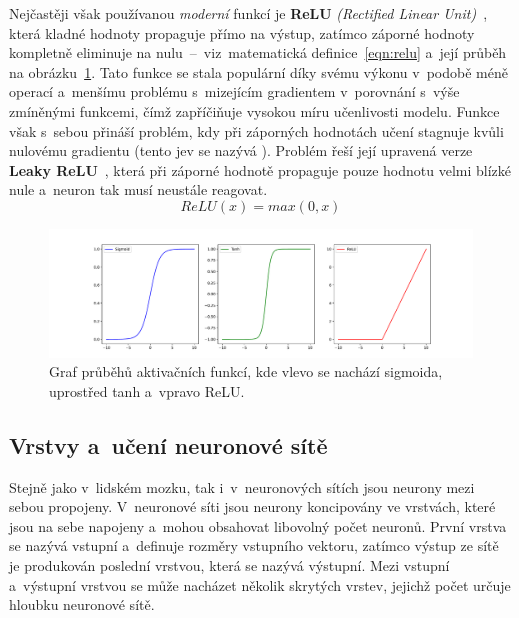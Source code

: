 Nejčastěji však používanou \emph{moderní} funkcí je \textbf{ReLU} \emph{(Rectified Linear Unit)}~\cite{website:OverviewOfActivationFunctions}, která kladné hodnoty propaguje přímo na výstup, zatímco záporné hodnoty kompletně eliminuje na nulu~--~viz~matematická definice~\ref{eqn:relu} a~její průběh na obrázku~\ref{img:functions}. Tato funkce se stala populární díky svému výkonu v~podobě méně operací a~menšímu problému s~mizejícím gradientem v~porovnání s~výše zmíněnými funkcemi, čímž zapříčiňuje vysokou míru učenlivosti modelu. Funkce však s~sebou přináší problém, kdy při záporných hodnotách učení stagnuje kvůli nulovému gradientu (tento jev se nazývá \emph{}). Problém řeší její upravená verze \textbf{Leaky ReLU}~\cite{website:OverviewOfActivationFunctions}, která při záporné hodnotě propaguje pouze hodnotu velmi blízké nule a~neuron tak musí neustále reagovat. 
\begin{equation}
    \label{eqn:relu}
    ReLU(x) = max(0, x)
\end{equation}

\begin{figure}[hbt]
	\centering
	\setlength{\fboxsep}{0pt}
	\includegraphics[width=1.0\textwidth]{obrazky-figures/actFunctions.pdf}
	\caption{Graf průběhů aktivačních funkcí, kde vlevo se nachází sigmoida, uprostřed tanh a~vpravo ReLU.}
	\label{img:functions}
\end{figure}

\subsection{Vrstvy a~učení neuronové sítě}
Stejně jako v~lidském mozku, tak i~v~neuronových sítích jsou neurony mezi sebou propojeny. V~neuronové síti jsou neurony koncipovány ve vrstvách, které jsou na sebe napojeny a~mohou obsahovat libovolný počet neuronů. První vrstva se nazývá vstupní a~definuje rozměry vstupního vektoru, zatímco výstup ze sítě je produkován poslední vrstvou, která se nazývá výstupní. Mezi vstupní a~výstupní vrstvou se může nacházet několik skrytých vrstev, jejichž počet určuje hloubku neuronové sítě.

